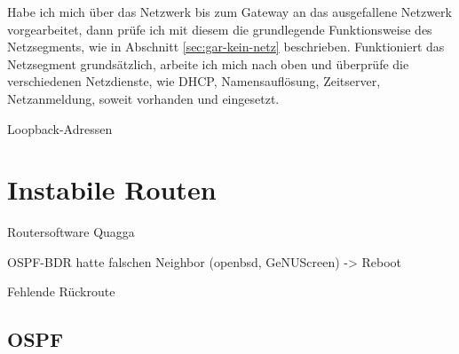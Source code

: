 \begin{normaltext}
  Habe ich mich über das Netzwerk bis zum Gateway an das ausgefallene Netzwerk
  vorgearbeitet, dann prüfe ich mit diesem die grundlegende Funktionsweise des
  Netzsegments, wie in Abschnitt \ref{sec:gar-kein-netz} beschrieben.
  Funktioniert das Netzsegment grundsätzlich, arbeite ich mich  nach oben und
  überprüfe die verschiedenen Netzdienste, wie DHCP, Namensauflösung,
  Zeitserver, Netzanmeldung, soweit vorhanden und eingesetzt.

  \begin{Exkursbox}{Loopback-Adressen}
  \end{Exkursbox}
\end{normaltext}

\section{Instabile Routen}
\label{sec:instabile-routen}

\begin{notes}
\item Routersoftware Quagga
\item OSPF-BDR hatte falschen Neighbor (openbsd, GeNUScreen) -> Reboot
\item Fehlende Rückroute
\end{notes}


\subsection{OSPF}
\label{sec:ospf}

